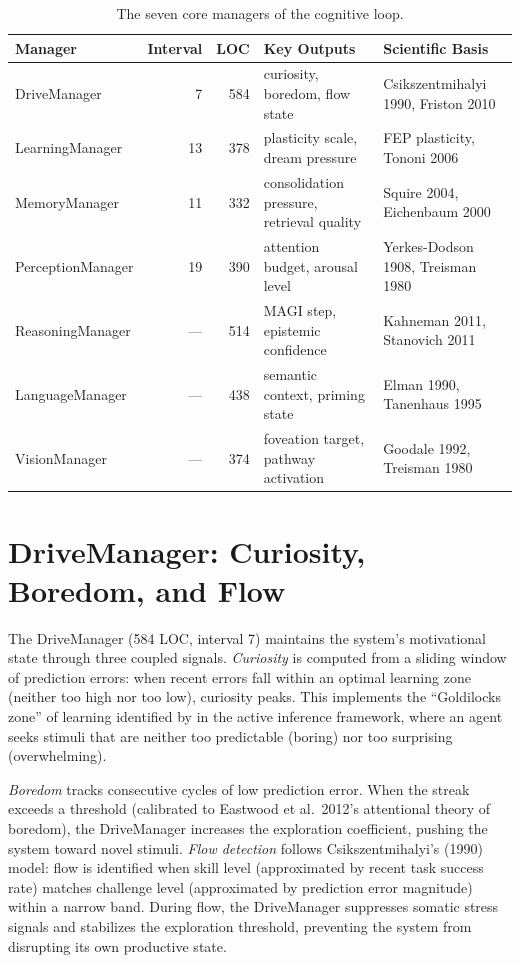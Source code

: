 \documentclass[12pt]{book}
\begin{document}
\begin{table}[htbp]
\centering
\caption{The seven core managers of the cognitive loop.}
\label{tab:core-managers}
\begin{tabular}{lrrlp{4.5cm}}
\toprule
\textbf{Manager} & \textbf{Interval} & \textbf{LOC} & \textbf{Key Outputs} & \textbf{Scientific Basis} \\
\midrule
DriveManager       & 7  & 584 & curiosity, boredom, flow state & Csikszentmihalyi 1990, Friston 2010 \\
LearningManager    & 13 & 378 & plasticity scale, dream pressure & FEP plasticity, Tononi 2006 \\
MemoryManager      & 11 & 332 & consolidation pressure, retrieval quality & Squire 2004, Eichenbaum 2000 \\
PerceptionManager  & 19 & 390 & attention budget, arousal level & Yerkes-Dodson 1908, Treisman 1980 \\
ReasoningManager   & --- & 514 & MAGI step, epistemic confidence & Kahneman 2011, Stanovich 2011 \\
LanguageManager    & --- & 438 & semantic context, priming state & Elman 1990, Tanenhaus 1995 \\
VisionManager      & --- & 374 & foveation target, pathway activation & Goodale 1992, Treisman 1980 \\
\bottomrule
\end{tabular}
\end{table}

\section{DriveManager: Curiosity, Boredom, and Flow}

The DriveManager (584 LOC, interval 7) maintains the system's motivational state through three coupled signals. \textit{Curiosity} is computed from a sliding window of prediction errors: when recent errors fall within an optimal learning zone (neither too high nor too low), curiosity peaks. This implements the ``Goldilocks zone'' of learning identified by \citet{friston2010} in the active inference framework, where an agent seeks stimuli that are neither too predictable (boring) nor too surprising (overwhelming).

\textit{Boredom} tracks consecutive cycles of low prediction error. When the streak exceeds a threshold (calibrated to Eastwood et al.\ 2012's attentional theory of boredom), the DriveManager increases the exploration coefficient, pushing the system toward novel stimuli. \textit{Flow detection} follows Csikszentmihalyi's (1990) model: flow is identified when skill level (approximated by recent task success rate) matches challenge level (approximated by prediction error magnitude) within a narrow band. During flow, the DriveManager suppresses somatic stress signals and stabilizes the exploration threshold, preventing the system from disrupting its own productive state.
\end{document}

